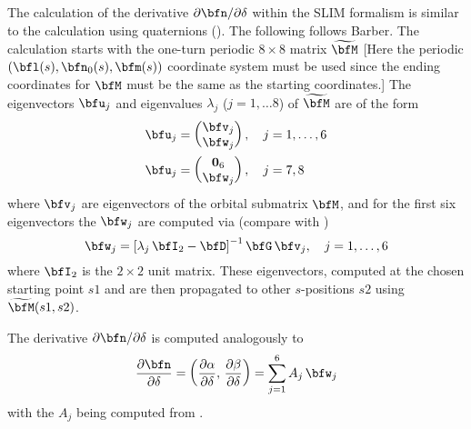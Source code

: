 {The calculation of the derivative ${\partial\bfn}/\partial\delta$ within the SLIM formalism is
similar to the calculation using quaternions (). The following follows
Barber\cite{b:barber99}.  The calculation starts with the one-turn periodic $8 \times 8$ matrix
$\widetilde \bfM$ [Here the periodic $(\bfl(s), \bfn_0(s), \bfm(s))$ coordinate system must be used
since the ending coordinates for $\bfM$ must be the same as the starting coordinates.]  The
eigenvectors $\bfu_j$ and eigenvalues $\lambda_j$ ($j = 1, \ldots 8$) of $\widetilde \bfM$ are of
the form
\begin{align}
  \bfu_j &= \begin{pmatrix} \bfv_j \\ \bfw_j \end{pmatrix}, \quad j = 1, \ldots, 6
  \label{qvw} \\
  \bfu_j &= \begin{pmatrix} \Bf 0_6 \\ \bfw_j \end{pmatrix}, \quad j = 7, 8 \nonumber
\end{align}
where $\bfv_j$ are eigenvectors of the orbital submatrix $\bfM$, and for the first six eigenvectors
the $\bfw_j$ are computed via (compare with )
\begin{equation}
  \bfw_j = \left[ \lambda_j \, \bfI_2 - \bfD \right]^{-1} \bfG \, \bfv_j, \quad j = 1, \ldots, 6
  \label{wdlgv}
\end{equation}
where $\bfI_2$ is the $2 \times 2$ unit matrix. These eigenvectors, computed at the chosen starting
point $s1$ and are then propagated to other $s$-positions $s2$ using ${\widetilde \bfM}(s1, s2)$.

The derivative ${\partial \bfn}/\partial \delta$ is computed analogously to 
\begin{equation}
  \frac{\partial \bfn}{\partial \delta} = 
  \left( \frac{\partial \alpha}{\partial \delta}, \, \frac{\partial \beta}{\partial \delta} \right) = 
  \sum_{j = 1}^6 A_j \, \bfw_j
  \label{ndaw}
\end{equation}
with the $A_j$ being computed from .

}
